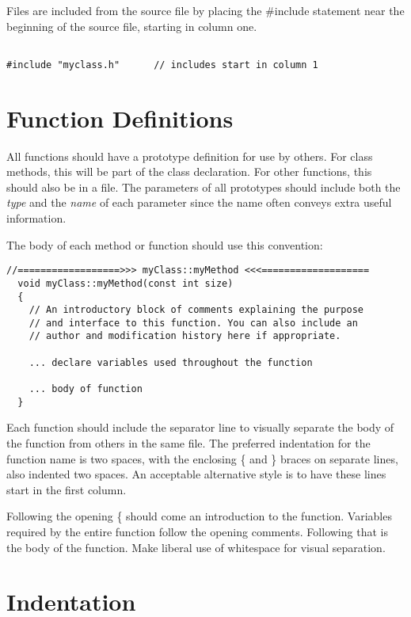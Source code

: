 Files are included from the source file by placing the \#include
statement near the beginning of the source file, starting in
column one.

\begin{verbatim}

#include "myclass.h"      // includes start in column 1

\end{verbatim}

\section{Function Definitions}

All functions should have a prototype definition for use
by others. For class methods, this will be part of the class
declaration. For other functions, this should also be in a
 file. The parameters of all prototypes should include
both the \emph{type} and the \emph{name} of each parameter since
the name often conveys extra useful information.

The body of each method or function should use this convention:

\footnotesize
\begin{verbatim}
//==================>>> myClass::myMethod <<<===================
  void myClass::myMethod(const int size)
  {
    // An introductory block of comments explaining the purpose
    // and interface to this function. You can also include an
    // author and modification history here if appropriate.

    ... declare variables used throughout the function

    ... body of function
  }
\end{verbatim}
\normalfont\normalsize

Each function should include the separator line to visually
separate the body of the function from others in the same file.
The preferred indentation for the function name is two spaces,
with the enclosing \{ and \} braces on separate lines, also
indented two spaces. An acceptable alternative style is to
have these lines start in the first column.

Following the opening \{ should come an introduction to the
function. Variables required by the entire function follow
the opening comments.  Following that is the body of the function.
Make liberal use of whitespace for visual separation.

\section{Indentation}

